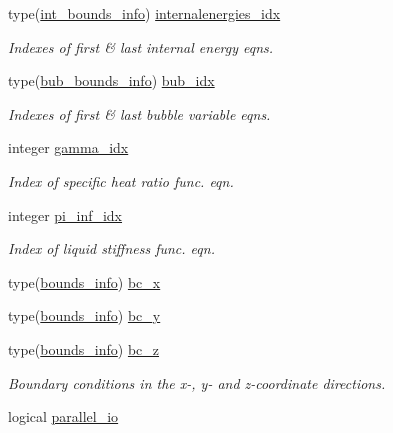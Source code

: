\begin{DoxyCompactItemize}
type(\hyperlink{structm__derived__types_1_1int__bounds__info}{int\+\_\+bounds\+\_\+info}) \hyperlink{namespacem__global__parameters_a9eb3789b90381530338a223c99cf1090}{internalenergies\+\_\+idx}
\begin{DoxyCompactList}\small\item\em Indexes of first \& last internal energy eqns. \end{DoxyCompactList}\item 
type(\hyperlink{structm__derived__types_1_1bub__bounds__info}{bub\+\_\+bounds\+\_\+info}) \hyperlink{namespacem__global__parameters_a9a425d1bd91d1765043adf8410b98bf7}{bub\+\_\+idx}
\begin{DoxyCompactList}\small\item\em Indexes of first \& last bubble variable eqns. \end{DoxyCompactList}\item 
integer \hyperlink{namespacem__global__parameters_a4ecdedaf3db880f8d71dbefc816322f8}{gamma\+\_\+idx}
\begin{DoxyCompactList}\small\item\em Index of specific heat ratio func. eqn. \end{DoxyCompactList}\item 
integer \hyperlink{namespacem__global__parameters_a7db1a23566279bdbc7da68850c596c69}{pi\+\_\+inf\+\_\+idx}
\begin{DoxyCompactList}\small\item\em Index of liquid stiffness func. eqn. \end{DoxyCompactList}\item 
type(\hyperlink{structm__derived__types_1_1bounds__info}{bounds\+\_\+info}) \hyperlink{namespacem__global__parameters_aa46a7f3638e49fa9ec33ea859b9e6a5a}{bc\+\_\+x}
\item 
type(\hyperlink{structm__derived__types_1_1bounds__info}{bounds\+\_\+info}) \hyperlink{namespacem__global__parameters_a68eaaca2982b39252417b29ef5d0f9c3}{bc\+\_\+y}
\item 
type(\hyperlink{structm__derived__types_1_1bounds__info}{bounds\+\_\+info}) \hyperlink{namespacem__global__parameters_a6769808569174ff0eef096e958889837}{bc\+\_\+z}
\begin{DoxyCompactList}\small\item\em Boundary conditions in the x-\/, y-\/ and z-\/coordinate directions. \end{DoxyCompactList}\item 
logical \hyperlink{namespacem__global__parameters_ac127ac2a9036e1cdb7e6c41159cacdfb}{parallel\+\_\+io}

\end{DoxyCompactItemize}
